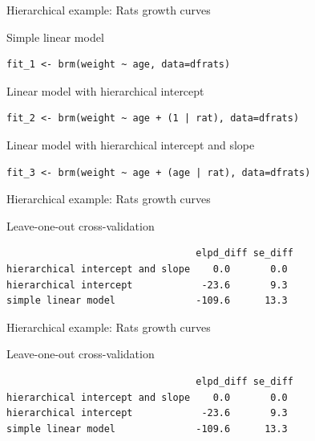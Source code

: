 \documentclass[english,t]{beamer}
\begin{document}
\begin{frame}[fragile]

  {\Large\color{navyblue} Hierarchical example: Rats growth curves}

Simple linear model
\begin{verbatim}
fit_1 <- brm(weight ~ age, data=dfrats)
\end{verbatim}

Linear model with hierarchical intercept
\begin{verbatim}
fit_2 <- brm(weight ~ age + (1 | rat), data=dfrats)
\end{verbatim}

 Linear model with hierarchical intercept and slope
\begin{verbatim}
fit_3 <- brm(weight ~ age + (age | rat), data=dfrats)
\end{verbatim}

\end{frame}

\begin{frame}[fragile]

  {\Large\color{navyblue} Hierarchical example: Rats growth curves}

Leave-one-out cross-validation
\begin{verbatim}
                                 elpd_diff se_diff
hierarchical intercept and slope    0.0       0.0 
hierarchical intercept            -23.6       9.3 
simple linear model              -109.6      13.3 
\end{verbatim}


\end{frame}

\begin{frame}[fragile]

  {\Large\color{navyblue} Hierarchical example: Rats growth curves}

Leave-one-out cross-validation
\begin{verbatim}
                                 elpd_diff se_diff
hierarchical intercept and slope    0.0       0.0 
hierarchical intercept            -23.6       9.3 
simple linear model              -109.6      13.3 
\end{verbatim}


\end{frame}
\end{document}
